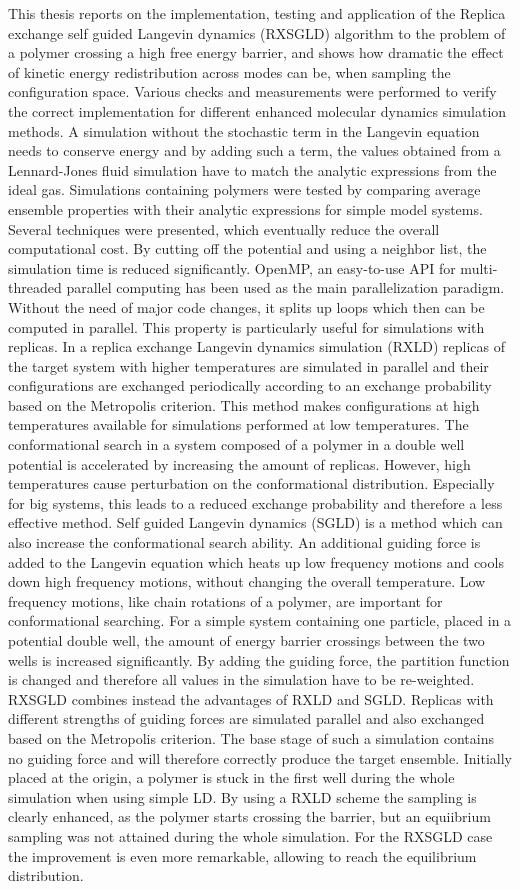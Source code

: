 \documentclass[a4paper]{article}
\begin{document}
This thesis reports on the implementation, testing and application of the Replica exchange self guided Langevin dynamics (RXSGLD) algorithm to the problem of a polymer crossing a high free energy barrier, and shows how dramatic the effect of kinetic energy redistribution across modes can be, when sampling the configuration space. Various checks and measurements were performed to verify the correct implementation for different enhanced molecular dynamics simulation methods. A simulation without the stochastic term in the Langevin equation needs to conserve energy and by adding such a term, the values obtained from a Lennard-Jones fluid simulation have to match the analytic expressions from the ideal gas. Simulations containing polymers were tested by comparing average ensemble properties with their analytic expressions for simple model systems. Several techniques were presented, which eventually reduce the overall computational cost. By cutting off the potential and using a neighbor list, the simulation time is reduced significantly. OpenMP, an easy-to-use API for multi-threaded parallel computing has been used as the main parallelization paradigm. Without the need of major code changes, it splits up loops which then can be computed in parallel. This property is particularly useful for simulations with replicas. In a replica exchange Langevin dynamics simulation (RXLD) replicas of the target system with higher temperatures are simulated in parallel and their configurations are exchanged periodically according to an exchange probability based on the Metropolis criterion. This method makes configurations at high temperatures available for simulations performed at low temperatures. The conformational search in a system composed of a polymer in a double well potential is accelerated by increasing the amount of replicas. However, high temperatures cause perturbation on the conformational distribution. Especially for big systems, this leads to a reduced exchange probability and therefore a less effective method. Self guided Langevin dynamics (SGLD) is a method which can also increase the conformational search ability. An additional guiding force is added to the Langevin equation which heats up low frequency motions and cools down high frequency motions, without changing the overall temperature. Low frequency motions, like chain rotations of a polymer, are important for conformational searching. For a simple system containing one particle, placed in a potential double well, the amount of energy barrier crossings between the two wells is increased significantly. By adding the guiding force, the partition function is changed and therefore all values in the simulation have to be re-weighted. RXSGLD combines instead the advantages of RXLD and SGLD. Replicas with different strengths of guiding forces are simulated parallel and also exchanged based on the Metropolis criterion. The base stage of such a simulation contains no guiding force and will therefore correctly produce the target ensemble. Initially placed at the origin, a polymer is stuck in the first well during the whole simulation when using simple LD. By using a RXLD scheme the sampling is clearly enhanced, as the polymer starts crossing the barrier, but an equiibrium sampling was not attained during the whole simulation.  For the RXSGLD case the improvement is even more remarkable, allowing to reach the equilibrium distribution.

\newpage 
 

\end{document}

